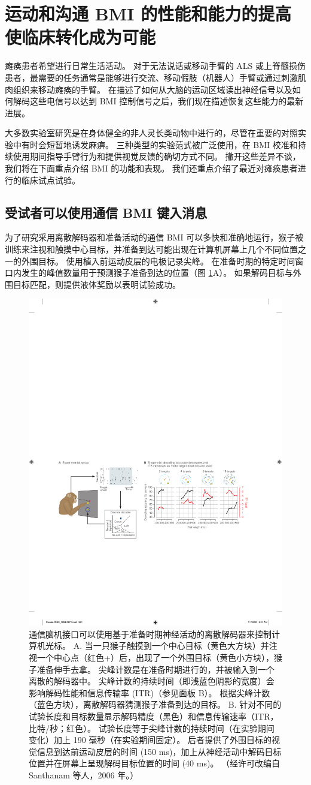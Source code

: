 \section{运动和沟通 BMI 的性能和能力的提高使临床转化成为可能}
瘫痪患者希望进行日常生活活动。 
对于无法说话或移动手臂的 ALS 或上脊髓损伤患者，最需要的任务通常是能够进行交流、移动假肢（机器人）手臂或通过刺激肌肉组织来移动瘫痪的手臂。
在描述了如何从大脑的运动区域读出神经信号以及如何解码这些电信号以达到 BMI 控制信号之后，我们现在描述恢复这些能力的最新进展。


大多数实验室研究是在身体健全的非人灵长类动物中进行的，尽管在重要的对照实验中有时会短暂地诱发麻痹。 
三种类型的实验范式被广泛使用，在 BMI 校准和持续使用期间指导手臂行为和提供视觉反馈的确切方式不同。 
撇开这些差异不谈，我们将在下面重点介绍 BMI 的功能和表现。 
我们还重点介绍了最近对瘫痪患者进行的临床试点试验。


\subsection{受试者可以使用通信 BMI 键入消息}

为了研究采用离散解码器和准备活动的通信 BMI 可以多快和准确地运行，猴子被训练来注视和触摸中心目标，并准备到达可能出现在计算机屏幕上几个不同位置之一的外围目标。 
使用植入前运动皮层的电极记录尖峰。 
在准备时期的特定时间窗口内发生的峰值数量用于预测猴子准备到达的位置（图 \ref{fig:39_7}A）。 
如果解码目标与外围目标匹配，则提供液体奖励以表明试验成功。

\begin{figure}[htbp]
	\centering
	\includegraphics[width=0.5\linewidth]{chap39/fig_39_7}
	\caption{通信脑机接口可以使用基于准备时期神经活动的离散解码器来控制计算机光标。 
		A. 当一只猴子触摸到一个中心目标（黄色大方块）并注视一个中心点（红色+）后，出现了一个外围目标（黄色小方块），猴子准备伸手去拿。 
		尖峰计数是在准备时期进行的，并被输入到一个离散的解码器中。 
		尖峰计数的持续时间（即浅蓝色阴影的宽度）会影响解码性能和信息传输率 (ITR)（参见面板 B）。 
		根据尖峰计数（蓝色方块），离散解码器猜测猴子准备到达的目标。 
		B. 针对不同的试验长度和目标数量显示解码精度（黑色）和信息传输速率（ITR，比特/秒；红色）。 
		试验长度等于尖峰计数的持续时间（在实验期间变化）加上 190 毫秒（在实验期间固定）。 
		后者提供了外围目标的视觉信息到达前运动皮层的时间 (150 ms)，加上从神经活动中解码目标位置并在屏幕上呈现解码目标位置的时间 (40 ms)。 （经许可改编自 Santhanam 等人，2006 年。）}
	\label{fig:39_7}
\end{figure}

